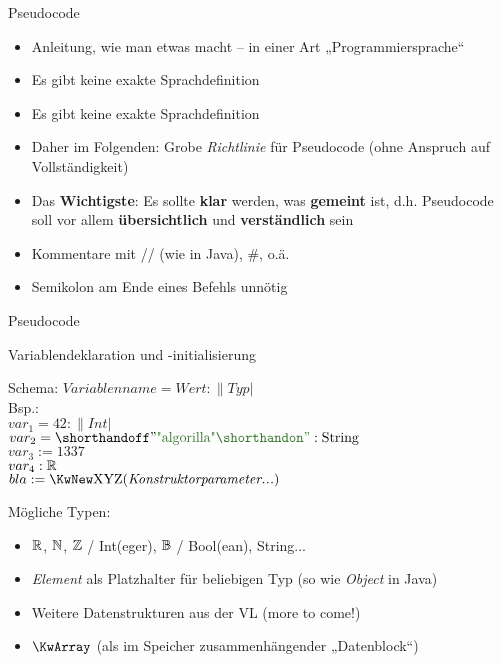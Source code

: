 
\begin{frame}{Pseudocode}
	\begin{itemize}
		\item Anleitung, wie man etwas macht -- in einer Art „Programmiersprache“
		\pause
		\item[\Pros\symbitemnegoffset] Es gibt keine exakte Sprachdefinition
		\item[\Cons\symbitemnegoffset] Es gibt keine exakte Sprachdefinition
		\pause
		\item Daher im Folgenden: Grobe \textit{Richtlinie} für Pseudocode (ohne Anspruch auf Vollständigkeit)
		\item Das \textbf{Wichtigste}: Es sollte \textbf{klar} werden, was \textbf{gemeint} ist, d.h. Pseudocode soll vor allem \textbf{übersichtlich} und \textbf{verständlich} sein
		\pause
		\item Kommentare mit // (wie in Java), \#, o.ä.
		\item Semikolon am Ende eines Befehls unnötig
	\end{itemize}
\end{frame}

\begin{frame}{Pseudocode} 
	\begin{exampleblock}{Variablendeklaration und -initialisierung}
		\begin{algorithm}[H]
			Schema: \quad $ Variablenname = Wert : \|Typ| $ \\
			\pause
			Bsp.: \\
			 \quad $ var_1 = 42 : \|Int| $ \\
			 \quad $ var_2 = \str{algorilla} : \|String| $ \\
			 \quad $ var_3 := 1337  $ \qquad {} \\
			 \quad $ var_4 : \mathbb{R} $ \qquad {} \\
			 \quad $ bla := \KwNew \|XYZ|(\textit{Konstruktorparameter...}) $ \\
		\end{algorithm}
	\end{exampleblock}
	\pause
	Mögliche Typen: \\
	\begin{itemize}
		\item $\mathbb{R}$, $\mathbb{N}$, $\mathbb{Z}$ / Int(eger), $\mathbb{B}$ / Bool(ean), String...
		\item \textit{Element} als Platzhalter für beliebigen Typ (so wie \textit{Object} in Java) 
		\item Weitere Datenstrukturen aus der VL (more to come!)
		\item $\KwArray$ (als im Speicher zusammenhängender „Datenblock“)
	\end{itemize}
\end{frame}


